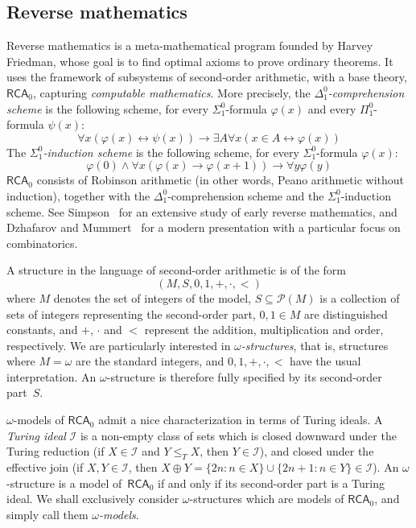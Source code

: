 \documentclass{article}
\numberwithin{theorem}{section}
\def\I{\mathcal{I}}
\def\P{\mathcal{P}}
\newcommand{\RCA}[0]{\mathsf{RCA}}
\begin{document}
\subsection{Reverse mathematics}

Reverse mathematics is a meta-mathematical program founded by Harvey Friedman, whose goal is to find optimal axioms to prove ordinary theorems. It uses the framework of subsystems of second-order arithmetic, with a base theory, $\RCA_0$, capturing \emph{computable mathematics}. More precisely, the \emph{$\Delta^0_1$-comprehension scheme} is the following scheme, for every $\Sigma^0_1$-formula $\varphi(x)$ and every $\Pi^0_1$-formula $\psi(x)$:
$$
\forall x(\varphi(x) \leftrightarrow \psi(x)) \to \exists A \forall x(x \in A \leftrightarrow \varphi(x))
$$
The \emph{$\Sigma^0_1$-induction scheme} is the following scheme, for every $\Sigma^0_1$-formula $\varphi(x)$:
$$
\varphi(0) \wedge \forall x(\varphi(x) \to \varphi(x+1)) \to \forall y \varphi(y)
$$
$\RCA_0$ consists of Robinson arithmetic (in other words, Peano arithmetic without induction), together with the $\Delta^0_1$-comprehension scheme and the $\Sigma^0_1$-induction scheme. See Simpson~\cite{simpson2009subsystems} for an extensive study of early reverse mathematics, and Dzhafarov and Mummert~\cite{dzhafarov2022reverse} for a modern presentation with a particular focus on combinatorics.

A structure in the language of second-order arithmetic is of the form 
$$(M, S, 0, 1, +, \cdot, <)$$
where $M$ denotes the set of integers of the model, $S \subseteq \P(M)$ is a collection of sets of integers representing the second-order part, $0, 1 \in M$ are distinguished constants, and $+$, $\cdot$ and $<$ represent the addition, multiplication and order, respectively. We are particularly interested in \emph{$\omega$-structures}, that is, structures where $M = \omega$ are the standard integers, and $0, 1, +, \cdot, <$ have the usual interpretation. An $\omega$-structure is therefore fully specified by its second-order part~$S$.

$\omega$-models of $\RCA_0$ admit a nice characterization in terms of Turing ideals. A \emph{Turing ideal} $\I$ is a non-empty class of sets which is closed downward under the Turing reduction (if $X \in \I$ and $Y \leq_T X$, then $Y \in \I$), and closed under the effective join (if $X, Y \in \I$, then $X \oplus Y = \{ 2n : n \in X \} \cup \{ 2n+1 : n \in Y \} \in \I$). An $\omega$-structure is a model of~$\RCA_0$ if and only if its second-order part is a Turing ideal. We shall exclusively consider $\omega$-structures which are models of $\RCA_0$, and simply call them \emph{$\omega$-models}.
\end{document}
